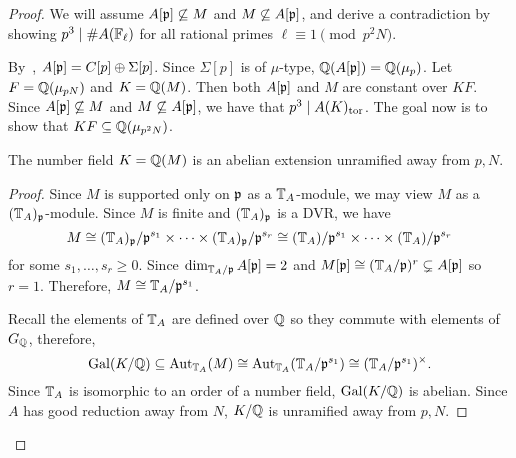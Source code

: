 \documentclass[thesis.tex]{subfiles}
\begin{document}
\begin{proof}
    We will assume $A[\mathfrak{p}]\not\subseteq M$ and $M\not\subseteq A[\mathfrak{p}]$, and
    derive a contradiction by showing $p^3\mid \#A(\mathbb{F}_\ell)$ for all rational
    primes $\ell \equiv 1\pmod{p^2N}$.

    By~\cite[Cor. 16.3]{mazur:eisenstein}, $A[\mathfrak{p}]=C[p]\oplus \Sigma[p]$. Since
    $\Sigma[p]$ is of $\mu$-type, $\mathbb{Q}(A[\mathfrak{p}])=\mathbb{Q}(\mu_p)$. Let
    $F=\mathbb{Q}(\mu_{pN})$ and $K=\mathbb{Q}(M)$. Then both $A[\mathfrak{p}]$ and $M$ are constant
    over $KF$. Since $A[\mathfrak{p}]\not\subseteq M$ and $M\not\subseteq A[\mathfrak{p}]$, we have
    that $p^3\mid A(K)_{\mathrm{tor}}$. The goal now is to show that $KF\subseteq
    \mathbb{Q}(\mu_{p^2 N})$.
    
    \begin{lemma}
        The number field $K=\mathbb{Q}(M)$ is an abelian extension unramified away
        from $p, N$.
    \end{lemma}
    \begin{proof}
        Since $M$ is supported only on $\mathfrak{p}$ as a $\mathbb{T}_A$-module, we may view
        $M$ as a $(\mathbb{T}_A)_{\mathfrak{p}}$-module. Since $M$ is finite and $(\mathbb{T}_A)_{\mathfrak{p}}$ is a
        DVR\@, we have
        \[
            M\cong (\mathbb{T}_A)_{\mathfrak{p}} / \mathfrak{p}^{s_1} \times\cdots \times (\mathbb{T}_A)_{\mathfrak{p}} /
            \mathfrak{p}^{s_r}\cong (\mathbb{T}_A)/\mathfrak{p}^{s_1} \times \cdots \times
            (\mathbb{T}_A)/\mathfrak{p}^{s_r}
        \]
        for some $s_1,\ldots,s_r\geq 0$. Since $\dim_{\mathbb{T}_A/\mathfrak{p}} A[\mathfrak{p}]=2$ and
        $M[\mathfrak{p}]\cong (\mathbb{T}_A / \mathfrak{p})^r \subsetneq A[\mathfrak{p}]$ so $r=1$. Therefore,
        $M\cong \mathbb{T}_A/\mathfrak{p}^{s_1}$.

        Recall the elements of $\mathbb{T}_A$ are defined over $\mathbb{Q}$ so they commute
        with elements of $G_{\mathbb{Q}}$, therefore,
        \[
            \operatorname{Gal}(K/\mathbb{Q})\subseteq \operatorname{Aut}_{\mathbb{T}_A} (M) \cong \operatorname{Aut}_{\mathbb{T}_A}
            (\mathbb{T}_A/\mathfrak{p}^{s_1}) \cong (\mathbb{T}_A/\mathfrak{p}^{s_1})^\times.
        \]
        Since $\mathbb{T}_A$ is isomorphic to an order of a number field,
        $\operatorname{Gal}(K/\mathbb{Q})$ is abelian. Since $A$ has good reduction away from $N$,
        $K/\mathbb{Q}$ is unramified away from $p, N$.
    \end{proof}


\end{proof}
\end{document}
